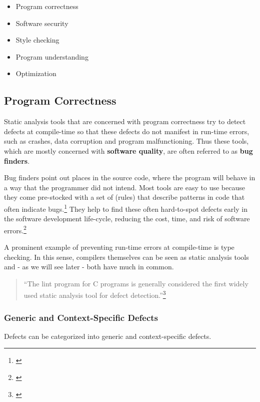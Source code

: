 \begin{itemize}\addtolength{\itemsep}{-0.5\baselineskip}
\item Program correctness
\item Software security
\item Style checking
\item Program understanding
\item Optimization
\end{itemize}

\subsection{Program Correctness}

Static analysis tools that are concerned with program correctness try to detect defects at compile-time so that these defects do not manifest in run-time errors, such as crashes, data corruption and program malfunctioning. Thus these tools, which are mostly concerned with \textbf{software quality}, are often referred to as \textbf{bug finders}.

Bug finders point out places in the source code, where the program will behave in a way that the programmer did not intend. Most tools are easy to use because they come pre-stocked with a set of  (rules) that describe patterns in code that often indicate bugs.\footnote{\citep[32]{SecureProgramming}} They help to find these often hard-to-spot defects early in the software development life-cycle, reducing the cost, time, and risk of software errors.\footnote{\citep{CovertySA}}

A prominent example of preventing run-time errors at compile-time is type checking. In this sense, compilers themselves can be seen as static analysis tools and - as we will see later - both have much in common.

\begin{quotation}
``The lint program for C programs is generally considered the first widely used static analysis tool for defect detection.''\footnote{\citep[1]{UsingSAToFindBugs}}
\end{quotation}

\subsubsection{Generic and Context-Specific Defects}

Defects can be categorized into generic and context-specific defects.

